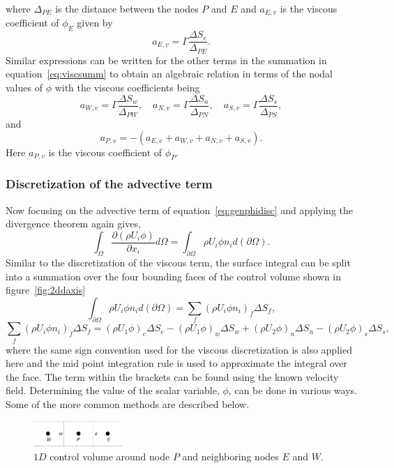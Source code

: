 where $\Delta_{PE}$ is the distance between the nodes $P$ and $E$ and $a_{E,v}$ is the viscous coefficient of $\phi_E$ given by
\begin{equation*}
a_{E,v} = \Gamma \frac{\Delta S_e}{\Delta_{PE}}.
\end{equation*}
Similar expressions can be written for the other terms in the summation in equation~\ref{eq:viscsumm} to obtain an algebraic relation in terms of the nodal values of $\phi$ with the viscous coefficients being
\begin{equation*}
a_{W,v} = \Gamma \frac{\Delta S_w}{\Delta_{PW}}, \quad a_{N,v} = \Gamma \frac{\Delta S_n}{\Delta_{PN}}, \quad a_{S,v} = \Gamma \frac{\Delta S_s}{\Delta_{PS}},
\end{equation*}
and
\begin{equation*}
a_{P,v} = -(a_{E,v} + a_{W,v} + a_{N,v} + a_{S,v}).
\end{equation*}
Here $a_{P,v}$ is the viscous coefficient of $\phi_{P}$.
\subsubsection{Discretization of the advective term}
Now focusing on the advective term of equation~\ref{eq:genphidisc} and applying the divergence theorem again gives,
\begin{equation}
\int_{\Omega} \frac{\partial (\rho U_i \phi)}{\partial x_i} d\Omega = \int_{\partial \Omega} \rho U_i \phi n_i d(\partial \Omega).
\end{equation}
Similar to the discretization of the viscous term, the surface integral can be split into a summation over the four bounding faces of the control volume shown in figure~\ref{fig:2ddaxis}
\begin{equation*}
\int_{\partial \Omega} \rho U_i \phi n_i d(\partial \Omega) = \sum_f \left(\rho U_i \phi n_i \right)_f \Delta S_f,
\end{equation*}
\begin{equation*}
\sum_f \left(\rho U_i \phi n_i \right)_f \Delta S_f = \left(\rho U_1 \phi \right)_e \Delta S_e - \left(\rho U_1 \phi \right)_w \Delta S_w + \left(\rho U_2 \phi \right)_n \Delta S_n - \left(\rho U_2 \phi \right)_s \Delta S_s,
\end{equation*}
where the same sign convention used for the viscous discretization is also applied here and the mid point integration rule is used to approximate the integral over the face. The  term within the brackets can be found using the known velocity field. Determining the value of the scalar variable, $\phi$, can be done in various ways. Some of the more common methods are described below.
\begin{figure}[h]
\centering
\captionsetup{justification=centering}
 \includegraphics[width=0.3\textwidth]{ch3_su2eqn/figures/1dcv.png}
\caption{$1D$ control volume around node $P$ and neighboring nodes $E$ and $W$.}
 \label{fig:ch2pefrcinterp}
\end{figure}

